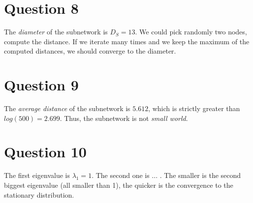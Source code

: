 \documentclass[a4paper]{report}
\begin{document}
\section*{Question 8}
The \textit{diameter} of the subnetwork is $D_S=13$.
\medbreak
We could pick randomly two nodes, compute the distance.
If we iterate many times and we keep the maximum of the computed distances, we should converge to the diameter.

\section*{Question 9}
The \textit{average distance} of the subnetwork is $5.612$, which is strictly greater than $log(500)=2.699$. Thus, the subnetwork is not \textit{small world}.

\section*{Question 10}
The first eigenvalue is $\lambda_1 = 1$. The second one is ... .
\medbreak
The smaller is the second biggest eigenvalue (all smaller than 1), the quicker is the convergence to the stationary distribution.
\end{document}
